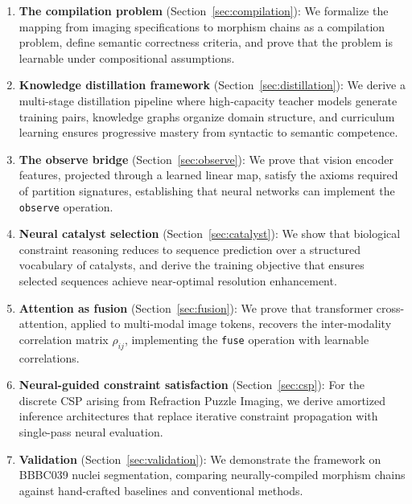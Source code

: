 \documentclass[11pt,a4paper]{article}
\theoremstyle{definition}
\theoremstyle{remark}
\begin{document}
\begin{enumerate}
    \item \textbf{The compilation problem} (Section~\ref{sec:compilation}): We formalize the mapping from imaging specifications to morphism chains as a compilation problem, define semantic correctness criteria, and prove that the problem is learnable under compositional assumptions.

    \item \textbf{Knowledge distillation framework} (Section~\ref{sec:distillation}): We derive a multi-stage distillation pipeline where high-capacity teacher models generate training pairs, knowledge graphs organize domain structure, and curriculum learning ensures progressive mastery from syntactic to semantic competence.

    \item \textbf{The observe bridge} (Section~\ref{sec:observe}): We prove that vision encoder features, projected through a learned linear map, satisfy the axioms required of partition signatures, establishing that neural networks can implement the \texttt{observe} operation.

    \item \textbf{Neural catalyst selection} (Section~\ref{sec:catalyst}): We show that biological constraint reasoning reduces to sequence prediction over a structured vocabulary of catalysts, and derive the training objective that ensures selected sequences achieve near-optimal resolution enhancement.

    \item \textbf{Attention as fusion} (Section~\ref{sec:fusion}): We prove that transformer cross-attention, applied to multi-modal image tokens, recovers the inter-modality correlation matrix $\rho_{ij}$, implementing the \texttt{fuse} operation with learnable correlations.

    \item \textbf{Neural-guided constraint satisfaction} (Section~\ref{sec:csp}): For the discrete CSP arising from Refraction Puzzle Imaging, we derive amortized inference architectures that replace iterative constraint propagation with single-pass neural evaluation.

    \item \textbf{Validation} (Section~\ref{sec:validation}): We demonstrate the framework on BBBC039 nuclei segmentation, comparing neurally-compiled morphism chains against hand-crafted baselines and conventional methods.
\end{enumerate}
\end{document}
